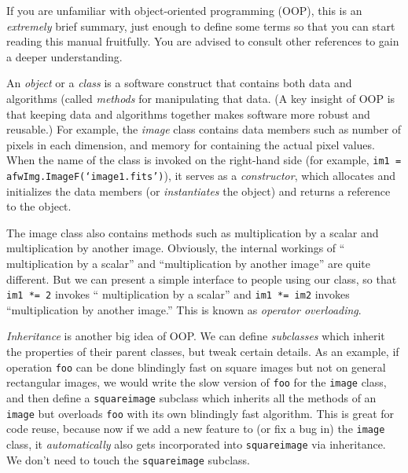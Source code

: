 

If you are unfamiliar with object-oriented programming (OOP), this is an
{\it extremely} brief summary, just enough to define some terms so
that you can start reading this manual fruitfully.  You are advised to
consult other references to gain a deeper understanding.

An {\it object} or a {\it class} is a software construct that contains
both data and algorithms (called {\it methods} for manipulating that
data.  (A key insight of OOP is that keeping data and algorithms
together makes software more robust and reusable.)  For example, the
{\it image} class contains data members such as number of pixels in
each dimension, and memory for containing the actual pixel values.
When the name of the class is invoked on the right-hand side (for
example, \texttt{im1 = afwImg.ImageF(`image1.fits')}), it serves as a
{\it constructor}, which allocates and initializes the data members
(or {\it instantiates} the object) and returns a reference to the
object.

The image class also contains methods such as multiplication by a
scalar and multiplication by another image. Obviously, the internal
workings of `` multiplication by a scalar'' and ``multiplication by
another image'' are quite different.  But we can present a simple
interface to people using our class, so that \texttt{im1 *= 2} invokes
`` multiplication by a scalar'' and \texttt{im1 *= im2} invokes
``multiplication by another image.''  This is known as {\it operator
  overloading}.

{\it Inheritance} is another big idea of OOP.  We can define {\it
  subclasses} which inherit the properties of their parent classes,
but tweak certain details.  As an example, if operation \texttt{foo}
can be done blindingly fast on square images but not on general
rectangular images, we would write the slow version of \texttt{foo}
for the \texttt{image} class, and then define a \texttt{squareimage}
subclass which inherits all the methods of an \texttt{image} but
overloads \texttt{foo} with its own blindingly fast algorithm.  This
is great for code reuse, because now if we add a new feature to (or
fix a bug in) the \texttt{image} class, it {\it automatically} also
gets incorporated into \texttt{squareimage} via inheritance.  We don't
need to touch the \texttt{squareimage} subclass.

